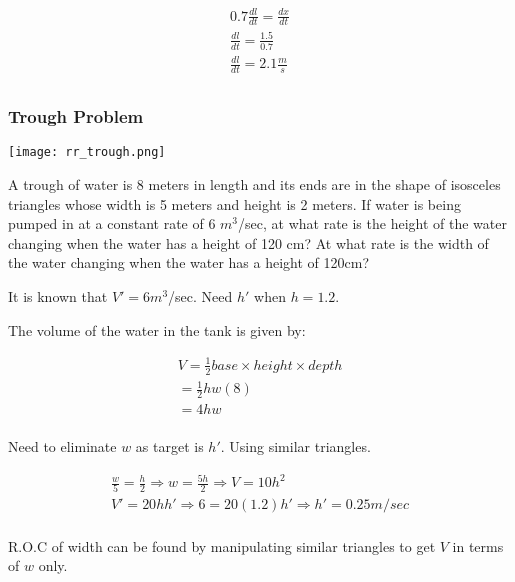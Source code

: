\vspace{5mm}

\begin{gather*}
    0.7\frac{dl}{dt}=\frac{dx}{dt}\\
    \frac{dl}{dt}=\frac{1.5}{0.7}\\
    \frac{dl}{dt}=2.1 \frac{m}{s}\\
\end{gather*}

\subsubsection{Trough Problem}

\begin{center}
    \texttt{[image: rr\_trough.png]}
\end{center}

A trough of water is 8 meters in length and its ends are in the shape of isosceles triangles whose width is 5 meters and height is 2 meters.
If water is being pumped in at a constant rate of 6 $m^3$/sec, 
at what rate is the height of the water changing when the water has a height of 120 cm? 
At what rate is the width of the water changing when the water has a height of 120cm?

\vspace{5mm}

It is known that $V'=6 m^3$/sec.
Need $h'$ when $h=1.2$.

\vspace{5mm}

The volume of the water in the tank is given by:

\begin{gather*}
    V=\frac{1}{2}base\times{height}\times{depth}\\
    =\frac{1}{2}hw(8)\\
    =4hw\\
\end{gather*}

Need to eliminate $w$ as target is $h'$.
Using similar triangles.

\begin{gather*}
    \frac{w}{5}=\frac{h}{2} \Rightarrow w=\frac{5h}{2} \Rightarrow V=10h^2\\
    V'=20hh' \Rightarrow 6=20(1.2)h' \Rightarrow h'=0.25m/sec\\
\end{gather*}

R.O.C of width can be found by manipulating similar triangles to get $V$ in terms of $w$ only.

